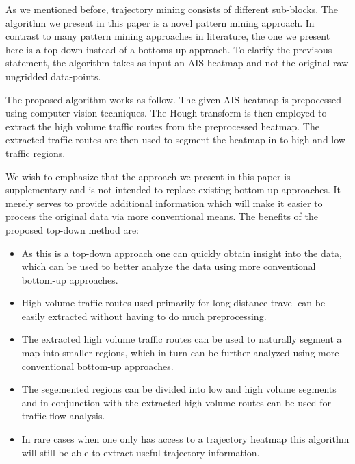 \documentclass{article}
\begin{document}
As we mentioned before, trajectory mining consists of different sub-blocks. The algorithm we present in this paper is a novel pattern mining approach. In contrast to many 
pattern mining approaches in literature, the one we present here is a top-down instead of a bottoms-up approach. To clarify the previsous statement, the algorithm 
takes as input an AIS heatmap and not the original raw ungridded data-points.

The proposed algorithm works as follow. The given AIS heatmap is prepocessed using computer vision techniques. The Hough transform is then employed to extract the high volume traffic routes from the preprocessed heatmap. The extracted traffic routes are then used to segment the 
heatmap in to high and low traffic regions.

We wish to emphasize that the approach we present in this paper is supplementary and is not intended to replace existing bottom-up approaches. It merely serves to provide additional information 
which will make it easier to process the original data via more conventional means.
The benefits of the proposed top-down method are:
\begin{itemize}
 \item As this is a top-down approach one can quickly obtain insight into the data, which can be used to better analyze the data using more conventional bottom-up approaches.
 \item High volume traffic routes used primarily for long distance travel can be easily extracted without having to do much preprocessing. 
 \item The extracted high volume traffic routes can be used to naturally segment a map into smaller regions, which in turn can be further analyzed using more conventional bottom-up approaches.
 \item The segemented regions can be divided into low and high volume segments and in conjunction with the extracted high volume routes can be used for traffic flow analysis.
 \item In rare cases when one only has access to a trajectory heatmap this algorithm will still be able to extract useful trajectory information.
 \end{itemize}
\end{document}
